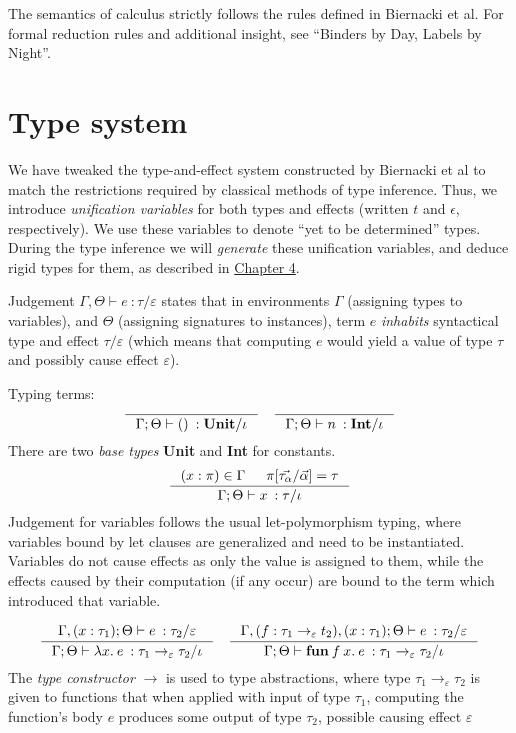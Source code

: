 \documentclass[declaration,shortabstract]{iithesis}
\theoremstyle{definition} \newtheorem{definition}{Definition}[section]
\newcommand{\types}[4][\Gamma;\Theta]{\ensuremath{{{#1} \vdash {#2} \: : {#3}/{#4}}}}
\newcommand{\arrow}[3]{{#1}\rightarrow_{#2}{#3}}
\newcommand{\lam}[1][x]{\ensuremath{\lambda #1.\:}}
\begin{document}
The semantics of calculus strictly follows the rules defined in Biernacki et al.
For formal reduction rules and additional insight, see ``Binders by Day, Labels by Night''\cite{binders-labels}.
\chapter{Type system}
We have tweaked the type-and-effect system constructed by Biernacki et al\cite{binders-labels}
to match the restrictions required by classical methods of type inference.
Thus, we introduce \textit{unification variables} for both types and effects
(written $t$ and $\epsilon$, respectively).
We use these variables to denote ``yet to be determined'' types.
During the type inference we will \textit{generate} these unification variables,
and deduce rigid types for them, as described in \hyperlink{chapter.4}{Chapter 4}.

Judgement $\types[\Gamma, \Theta]{e}{\tau}{\varepsilon}$ states that in environments $\Gamma$ (assigning types to variables),
and $\Theta$ (assigning signatures to instances), term $e$ \textit{inhabits} syntactical type and effect $\tau / \varepsilon$ (which means that computing $e$ would yield a value of type $\tau$ and possibly cause effect $\varepsilon$).

Typing terms:
$$
\inference{}{\types{()}{\textbf{Unit}}{\iota}}
\quad
\inference{}{\types{n}{\textbf{Int}}{\iota}}{}
$$
\setlength{\jot}{10pt}
There are two \textit{base types} \textbf{Unit} and \textbf{Int} for constants.
$$
\inference{(x : \pi) \in \Gamma & \pi[\vec{\tau_\alpha} / \vec{\alpha}] = \tau}{\types{x}{\tau}{\iota}}
$$
Judgement for variables follows the usual let-polymorphism typing, 
where variables bound by let clauses are generalized and need to be instantiated.
Variables do not cause effects as only the value is assigned to them,
while the effects caused by their computation (if any occur)
are bound to the term which introduced that variable.

$$
\inference{
    \types[\Gamma,(x : \tau_1); \Theta]{e}{\tau_2}{\varepsilon} 
}{
    \types{\lam e}{\arrow{\tau_1}{\varepsilon}{\tau_2}}{\iota}
}
\quad
\inference{
    \types[\Gamma, (f : \arrow{\tau_1}{\varepsilon}{t_2}),(x : \tau_1); \Theta]{e}{\tau_2}{\varepsilon} 
}{
    \types{\textbf{fun}\:f\:x.\: e}{\arrow{\tau_1}{\varepsilon}{\tau_2}}{\iota}
}
$$
The \textit{type constructor} $\rightarrow$ is used to type abstractions,
where type $\arrow{\tau_1}{\varepsilon}{\tau_2}$ is given to functions
that when applied with input of type $\tau_1$, computing the function's body $e$ produces some output of type $\tau_2$, possible causing effect $\varepsilon$
\end{document}
